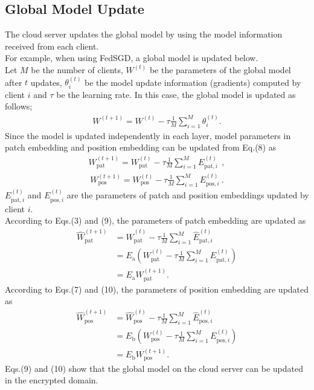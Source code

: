 \documentclass[conference, a4paper]{IEEEtran}
\begin{document}
\subsection{Global Model Update}
The cloud server updates the global model by using the model information received from each client. \\
For example, when using FedSGD, a global model is updated below.\\
\indent Let $M$ be the number of clients, $W^{(t)}$ be the parameters of the global model after $t$ updates, $\theta_{i}^{(t)}$ be the model update information (gradients) computed by client $i$ and $\tau$ be the learning rate. In this case, the global model is updated as follows;
\begin{gather}
  W^{(t+1)} = W^{(t)} - \tau \frac{1}{M} \sum^{M}_{i=1} \theta_{i}^{(t)}.
\end{gather}
Since the model is updated independently in each layer, model parameters in patch embedding and position embedding can be updated  from  Eq.(8) as
\begin{gather}
  W_{\text{pat}}^{(t+1)} = W_{\text{pat}}^{(t)} - \tau \frac{1}{M} \sum^{M}_{i=1} E_{\text{pat}, i}^{(t)} ~~ ,
\end{gather}
\begin{gather}
  W_{\text{pos}}^{(t+1)} = W_{\text{pos}}^{(t)} - \tau \frac{1}{M} \sum^{M}_{i=1} E_{\text{pos}, i}^{(t)}~.
\end{gather}
$E_{\text{pat},i}^{(t)}$ and $E_{\text{pos},i}^{(t)}$ are the parameters of patch and position embeddings updated by client $i$.\\
\indent According to Eqs.(3) and (9), the parameters of patch embedding are updated as
\begin{align}
   \widehat{W}_{\text{pat}}^{(t+1)} &= \widehat{W}_{\text{pat}}^{(t)} - \tau \frac{1}{M} \sum^{M}_{i=1} \widehat{E}_{\text{pat}, i}^{(t)} \nonumber \\
    &= E_{\text{a}} \left( W_{\text{pat}}^{(t)} - \tau \frac{1}{M} \sum^{M}_{i=1} E_{\text{pat}, i}^{(t)} \right) \nonumber \\
   &= E_{\text{a}} W_{\text{pat}}^{(t+1)} .
\end{align}
\indent According to Eqs.(7) and (10), the parameters of position embedding are updated as
\begin{align}
   \widehat{W}_{\text{pos}}^{(t+1)} &= \widehat{W}_{\text{pos}}^{(t)} - \tau \frac{1}{M} \sum^{M}_{i=1}  \widehat{E}_{\text{pos}, i}^{(t)} \nonumber \\
   &= E_{\text{b}} \left( W_{\text{pos}}^{(t)} - \tau \frac{1}{M} \sum^{M}_{i=1} E_{\text{pos}, i}^{(t)} \right) \nonumber \\
   &= E_{\text{b}} W_{\text{pos}}^{(t+1)} .
\end{align}
Eqs.(9) and (10) show that the global model on the cloud server can be updated in the encrypted domain.
\end{document}
